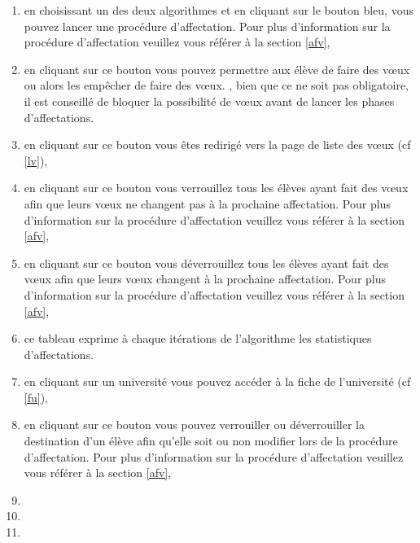              \begin{enumerate}
             	\item en choisissant un des deux algorithmes et en cliquant sur le bouton bleu, vous pouvez lancer une procédure d'affectation. Pour plus d'information sur la procédure d'affectation veuillez vous référer à la section \ref{afv},
             	\item en cliquant sur ce bouton vous pouvez permettre aux élève de faire des vœux ou alors les empêcher de faire des vœux. \att , bien que ce ne soit pas obligatoire, il est conseillé de bloquer la possibilité de vœux avant de lancer les phases d'affectations.
             	\item en cliquant sur ce bouton vous êtes redirigé vers la page de liste des vœux (cf \ref{lv}),
             	\item en cliquant sur ce bouton vous verrouillez tous les élèves ayant fait des vœux afin que leurs vœux ne changent pas à la prochaine affectation. Pour plus d'information sur la procédure d'affectation veuillez vous référer à la section \ref{afv}, 
             	\item en cliquant sur ce bouton vous déverrouillez tous les élèves ayant fait des vœux afin que leurs vœux changent à la prochaine affectation. Pour plus d'information sur la procédure d'affectation veuillez vous référer à la section \ref{afv}, 
             	\item ce tableau exprime à chaque itérations de l'algorithme les statistiques d'affectations.
             	\item en cliquant sur un université vous pouvez accéder à la fiche de l'université (cf \ref{fu}), 
             	\item en cliquant sur ce bouton vous pouvez verrouiller ou déverrouiller la destination d'un élève afin qu'elle soit ou non modifier lors de la procédure d'affectation. Pour plus d'information sur la procédure d'affectation veuillez vous référer à la section \ref{afv},
             	\item 
             	\item 
             	\item 
             \end{enumerate}
    
